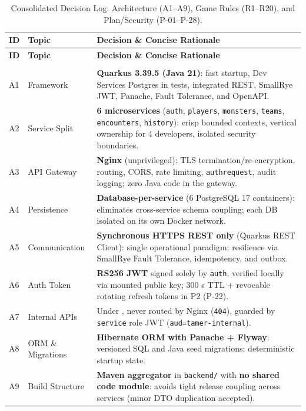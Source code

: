 \documentclass[10.5pt,a4paper]{article}
\DeclareRobustCommand{\code}[1]{\begingroup\def\_{\textunderscore\allowbreak}\texttt{#1}\endgroup}
\begin{document}
\begin{xltabular}{\linewidth}{@{}L{1.15cm}L{3.1cm}Y@{}}
\caption{Consolidated Decision Log: Architecture (A1–A9), Game Rules (R1–R20), and Plan/Security (P-01–P-28).}\label{tab:decisions}\\
\toprule
\textbf{ID} & \textbf{Topic} & \textbf{Decision \& Concise Rationale} \\
\midrule
\endfirsthead
\toprule
\textbf{ID} & \textbf{Topic} & \textbf{Decision \& Concise Rationale} \\
\midrule
\endhead
\bottomrule
\endfoot
{} \\
\midrule
A1 & Framework & \textbf{Quarkus 3.39.5 (Java 21)}: fast startup, Dev Services Postgres in tests, integrated REST, SmallRye JWT, Panache, Fault Tolerance, and OpenAPI. \\
A2 & Service Split & \textbf{6 microservices} (\code{auth}, \code{players}, \code{monsters}, \code{teams}, \code{encounters}, \code{history}): crisp bounded contexts, vertical ownership for 4 developers, isolated security boundaries. \\
A3 & API Gateway & \textbf{Nginx} (unprivileged): TLS termination/re-encryption, routing, CORS, rate limiting, \code{auth\_request}, audit logging; zero Java code in the gateway. \\
A4 & Persistence & \textbf{Database-per-service} (6 PostgreSQL 17 containers): eliminates cross-service schema coupling; each DB isolated on its own Docker network. \\
A5 & Communication & \textbf{Synchronous HTTPS REST only} (Quarkus REST Client): single operational paradigm; resilience via SmallRye Fault Tolerance, idempotency, and outbox. \\
A6 & Auth Token & \textbf{RS256 JWT} signed solely by \code{auth}, verified locally via mounted public key; 300 s TTL + revocable rotating refresh tokens in P2 (P-22). \\
A7 & Internal APIs & Under , never routed by Nginx (\code{404}), guarded by \code{service} role JWT (\code{aud=tamer-internal}). \\
A8 & ORM \& Migrations & \textbf{Hibernate ORM with Panache + Flyway}: versioned SQL and Java seed migrations; deterministic startup state. \\
A9 & Build Structure & \textbf{Maven aggregator} in \code{backend/} with \textbf{no shared code module}: avoids tight release coupling across services (minor DTO duplication accepted). \\

\end{xltabular}
\end{document}
